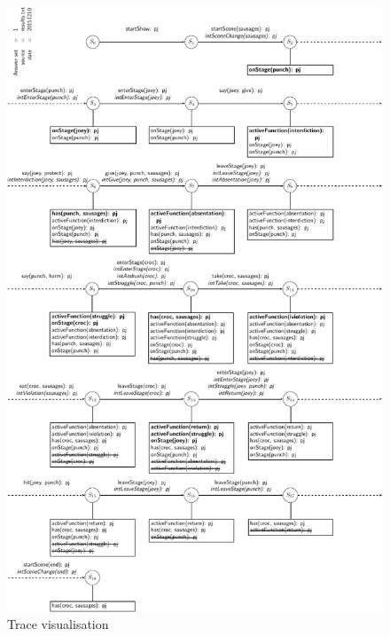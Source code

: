\documentclass[11pt]{report}
\begin{document}

\begin{figure}[!p]
    \includegraphics[height=0.95\textheight]{trace.pdf}
    \caption{Trace visualisation} \label{fig:tracevis}
\end{figure}

% 

%
\end{document}
